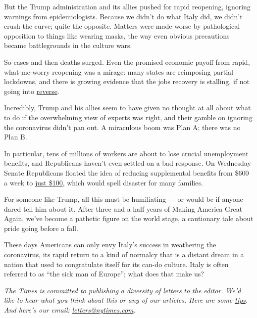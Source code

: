 But the Trump administration and its allies pushed for rapid reopening,
ignoring warnings from epidemiologists. Because we didn't do what Italy
did, we didn't crush the curve; quite the opposite. Matters were made
worse by pathological opposition to things like wearing masks, the way
even obvious precautions became battlegrounds in the culture wars.

So cases and then deaths surged. Even the promised economic payoff from
rapid, what-me-worry reopening was a mirage: many states are reimposing
partial lockdowns, and there is growing evidence that the jobs recovery
is stalling, if not going into
\href{https://twitter.com/bencasselman/status/1285964009326477315}{reverse}.

Incredibly, Trump and his allies seem to have given no thought at all
about what to do if the overwhelming view of experts was right, and
their gamble on ignoring the coronavirus didn't pan out. A miraculous
boom was Plan A; there was no Plan B.

In particular, tens of millions of workers are about to lose crucial
unemployment benefits, and Republicans haven't even settled on a bad
response. On Wednesday Senate Republicans floated the idea of reducing
supplemental benefits from \$600 a week to
\href{https://www.cnbc.com/2020/07/22/coronavirus-stimulus-republicans-consider-unemployment-insurance-extension.html}{just
\$100}, which would spell disaster for many families.

For someone like Trump, all this must be humiliating --- or would be if
anyone dared tell him about it. After three and a half years of Making
America Great Again, we've become a pathetic figure on the world stage,
a cautionary tale about pride going before a fall.

These days Americans can only envy Italy's success in weathering the
coronavirus, its rapid return to a kind of normalcy that is a distant
dream in a nation that used to congratulate itself for its can-do
culture. Italy is often referred to as ``the sick man of Europe''; what
does that make us?

\emph{The Times is committed to publishing}
\href{https://www.nytimes.com/2019/01/31/opinion/letters/letters-to-editor-new-york-times-women.html}{\emph{a
diversity of letters}} \emph{to the editor. We'd like to hear what you
think about this or any of our articles. Here are some}
\href{https://help.nytimes.com/hc/en-us/articles/115014925288-How-to-submit-a-letter-to-the-editor}{\emph{tips}}\emph{.
And here's our email:}
\href{mailto:letters@nytimes.com}{\emph{letters@nytimes.com}}\emph{.}

